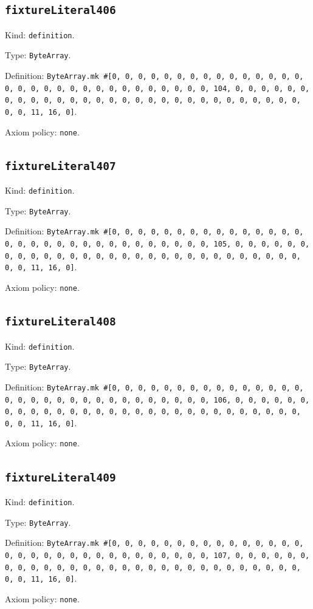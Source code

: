 \documentclass[11pt]{article}
\begin{document}
\subsection*{\texttt{fixtureLiteral406}}
\noindent Kind: \texttt{definition}.\par
\noindent Type: \texttt{ByteArray}.\par
\noindent Definition: \texttt{ByteArray.mk \#[0, 0, 0, 0, 0, 0, 0, 0, 0, 0, 0, 0, 0, 0, 0, 0, 0, 0, 0, 0, 0, 0, 0, 0, 0, 0, 0, 0, 0, 0, 0, 104, 0, 0, 0, 0, 0, 0, 0, 0, 0, 0, 0, 0, 0, 0, 0, 0, 0, 0, 0, 0, 0, 0, 0, 0, 0, 0, 0, 0, 0, 0, 0, 11, 16, 0]}.\par
\noindent Axiom policy: \texttt{none}.\par
\subsection*{\texttt{fixtureLiteral407}}
\noindent Kind: \texttt{definition}.\par
\noindent Type: \texttt{ByteArray}.\par
\noindent Definition: \texttt{ByteArray.mk \#[0, 0, 0, 0, 0, 0, 0, 0, 0, 0, 0, 0, 0, 0, 0, 0, 0, 0, 0, 0, 0, 0, 0, 0, 0, 0, 0, 0, 0, 0, 0, 105, 0, 0, 0, 0, 0, 0, 0, 0, 0, 0, 0, 0, 0, 0, 0, 0, 0, 0, 0, 0, 0, 0, 0, 0, 0, 0, 0, 0, 0, 0, 0, 11, 16, 0]}.\par
\noindent Axiom policy: \texttt{none}.\par
\subsection*{\texttt{fixtureLiteral408}}
\noindent Kind: \texttt{definition}.\par
\noindent Type: \texttt{ByteArray}.\par
\noindent Definition: \texttt{ByteArray.mk \#[0, 0, 0, 0, 0, 0, 0, 0, 0, 0, 0, 0, 0, 0, 0, 0, 0, 0, 0, 0, 0, 0, 0, 0, 0, 0, 0, 0, 0, 0, 0, 106, 0, 0, 0, 0, 0, 0, 0, 0, 0, 0, 0, 0, 0, 0, 0, 0, 0, 0, 0, 0, 0, 0, 0, 0, 0, 0, 0, 0, 0, 0, 0, 11, 16, 0]}.\par
\noindent Axiom policy: \texttt{none}.\par
\subsection*{\texttt{fixtureLiteral409}}
\noindent Kind: \texttt{definition}.\par
\noindent Type: \texttt{ByteArray}.\par
\noindent Definition: \texttt{ByteArray.mk \#[0, 0, 0, 0, 0, 0, 0, 0, 0, 0, 0, 0, 0, 0, 0, 0, 0, 0, 0, 0, 0, 0, 0, 0, 0, 0, 0, 0, 0, 0, 0, 107, 0, 0, 0, 0, 0, 0, 0, 0, 0, 0, 0, 0, 0, 0, 0, 0, 0, 0, 0, 0, 0, 0, 0, 0, 0, 0, 0, 0, 0, 0, 0, 11, 16, 0]}.\par
\noindent Axiom policy: \texttt{none}.\par
\end{document}
